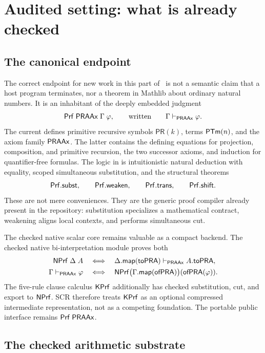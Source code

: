 \section{Audited setting: what is already checked}
\label{sec:audit}

\subsection{The canonical endpoint}

The correct endpoint for new work in this part of \repo\ is not a semantic
claim that a host program terminates, nor a theorem in Mathlib about ordinary
natural numbers.  It is an inhabitant of the deeply embedded judgment
\[
   \mathsf{Prf}\;\mathsf{PRAAx}\;\Gamma\;\varphi,
   \qquad\text{written}\qquad
   \Gamma\mathrel{\vdash_{\mathsf{PRAAx}}}\varphi.
\]
The current  defines primitive
recursive symbols \(\mathsf{PR}(k)\), terms \(\mathsf{PTm}(n)\), and the axiom family
\(\mathsf{PRAAx}\).  The latter contains the defining equations for projection,
composition, and primitive recursion, the two successor axioms, and induction
for quantifier-free formulas.  The logic in  is
intuitionistic natural deduction with equality, scoped simultaneous
substitution, and the structural theorems
\[
 \mathsf{Prf}.\mathsf{subst},\qquad
 \mathsf{Prf}.\mathsf{weaken},\qquad
 \mathsf{Prf}.\mathsf{trans},\qquad
 \mathsf{Prf}.\mathsf{shift}.
\]
These are not mere conveniences.  They are the generic proof compiler already
present in the repository: substitution specializes a mathematical contract,
weakening aligns local contexts, and  performs simultaneous
cut.

The checked native scalar core remains valuable as a compact backend.
The checked native bi-interpretation module proves both
\[
\begin{aligned}
  \mathsf{NPrf}\;\Delta\;A
  &\quad\Longleftrightarrow\quad
  \Delta.\mathsf{map}(\mathsf{toPRA})\mathrel{\vdash_{\mathsf{PRAAx}}} A.\mathsf{toPRA},\\
  \Gamma\mathrel{\vdash_{\mathsf{PRAAx}}}\varphi
  &\quad\Longleftrightarrow\quad
  \mathsf{NPrf}\bigl(\Gamma.\mathsf{map}(\mathsf{ofPRA})\bigr)
       (\mathsf{ofPRA}(\varphi)).
\end{aligned}
\]
The five-rule clause calculus \(\mathsf{KPrf}\) additionally has checked substitution,
cut, and export to \(\mathsf{NPrf}\).  SCR therefore treats \(\mathsf{KPrf}\) as an optional
compressed intermediate representation, not as a competing foundation.  The
portable public interface remains \(\mathsf{Prf}\;\mathsf{PRAAx}\).

\subsection{The checked arithmetic substrate}

